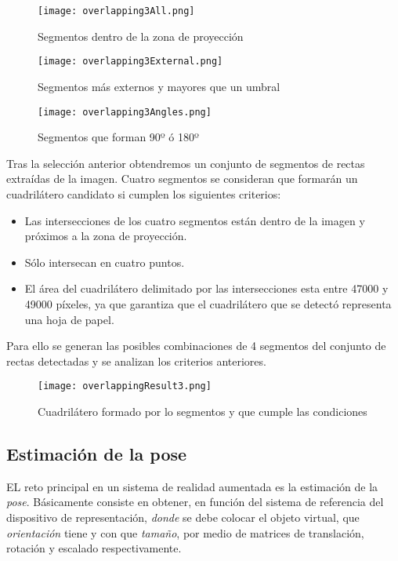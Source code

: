 \begin{figure} 
    \centering
    \texttt{[image: overlapping3All.png]}
    \caption{Segmentos dentro de la zona de proyección}
    \label{fig:overlappingAll}
  \end{figure}
  
 \begin{figure} 
    \centering
    \texttt{[image: overlapping3External.png]}
    \caption{Segmentos más externos y mayores que un umbral}
    \label{fig:overlappingExt}
  \end{figure}

  \begin{figure} 
    \centering
    \texttt{[image: overlapping3Angles.png]}
    \caption{Segmentos que forman 90º ó 180º}
    \label{fig:overlappingAngles}
  \end{figure}

Tras la selección anterior obtendremos un conjunto de segmentos de rectas extraídas de la imagen. Cuatro segmentos se consideran que formarán un cuadrilátero candidato si cumplen los siguientes criterios:

\begin{itemize}
\item Las intersecciones de los cuatro segmentos están dentro de la imagen y próximos a la zona de
  proyección.
\item Sólo intersecan en cuatro puntos.
\item El área del cuadrilátero delimitado por las intersecciones esta entre 47000 y 49000 píxeles, ya que garantiza que el cuadrilátero que se detectó representa una hoja de papel.
\end{itemize}

Para ello se generan las posibles combinaciones de 4 segmentos del conjunto de rectas detectadas y se analizan los criterios anteriores.
\begin{figure}[h!] 
    \centering
    \texttt{[image: overlappingResult3.png]}
    \caption{Cuadrilátero formado por lo segmentos y que cumple las condiciones}
    \label{fig:overlappingResult}
  \end{figure}


\subsection{Estimación de la pose}
EL reto principal en un sistema de realidad aumentada es la estimación de la \textit{pose}. Básicamente consiste en obtener, en función del sistema de referencia del dispositivo de representación, \textit{donde} se debe colocar el objeto virtual, que \textit{orientación} tiene y con que \textit{tamaño}, por medio de matrices de translación, rotación y escalado respectivamente. 

